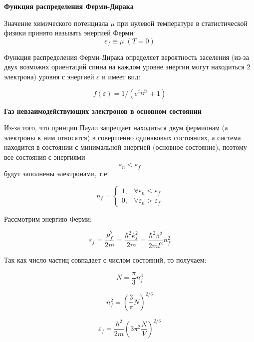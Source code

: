 \documentclass[__main__.tex]{subfiles}
\begin{document}
\textbf{Функция распределения Ферми-Дирака}

Значение химического потенциала $\mu$ при нулевой температуре в статистической физики принято называть энергией Ферми: 
$$\varepsilon_f \equiv \mu \; (T = 0)$$

Функция распределения Ферми-Дирака определяет вероятность заселения (из-за двух возможнх ориентаций спина на каждом уровне энергии могут находиться 2 электрона) уровня с энергией $\varepsilon$ и имеет вид:

$$f(\varepsilon) = 1/(e^{\frac{\varepsilon - \varepsilon_f}{kT}} + 1)$$

\textbf{Газ невзаимодействующих электронов в основном состоянии}

Из-за того, что принцип Паули запрещает находиться двум фермионам (а электроны к ним относятся) в совершенно одинаковых состояниях, а система находится в состоянии с минимальной энергией (основное состояние), поэтому все состояния с энергиями $$\varepsilon_n \le \varepsilon_f$$ будут заполнены электронами, т.е:

$$n_f = \begin{cases}1, & \forall \varepsilon_n \le \varepsilon_f \\ 0, & \forall \varepsilon_n > \varepsilon_f \end{cases}$$

Рассмотрим энергию Ферми:

$$\varepsilon_f = \frac{p_f^2}{2m} = \frac{\hbar^2k_f^2}{2m} = \frac{\hbar^2 \pi^2}{2ml^2}n_f^2$$

Так как число частиц совпадает с числом состояний, то получаем:

$$N = \frac{\pi}{3}n_f^3$$

$$n_f^2 = \left(\frac{3}{\pi}N\right)^{2/3}$$

$$\varepsilon_f = \frac{\hbar^2}{2m}\left(3\pi^2\frac{N}{V}\right)^{2/3}$$
\end{document}
